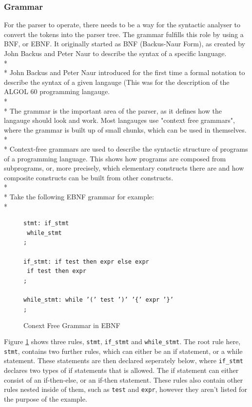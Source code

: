 \documentclass[12pt]{report}
\begin{document}
\subsubsection{Grammar}\label{subsubsec:grammar}
For the parser to operate, there needs to be a way for the syntactic analyser to convert the tokens into the parser tree.  The grammar fulfills this role by using a BNF, or EBNF.  It originally started as BNF (Backus-Naur Form), as created by John Backus and Peter Naur to describe the syntax of a specific language.\\*
\\*
John Backus and Peter Naur introduced for the first time a formal notation to describe the syntax of a given langauge (This was for the description of the ALGOL 60 programming langauge. \citep{whatisbnfnotation}
\\*
\\*
The grammar is the important area of the parser, as it defines how the langauge should look and work.  Most langauges use "context free grammars", where the grammar is built up of small chunks, which can be used in themselves.\\*
\\*
Context-free grammars are used to describe the syntactic structure of programs of a programming language.  This shows how programs are composed from subprograms, or, more precisely, which elementary constructs there are and how composite constructs can be built from other constructs. \citep{compilerdesign95}\\*
\\*
Take the following EBNF grammar for example:\\*
\begin{figure}[H]
\begin{tabbing}
\texttt{stmt:}\= \texttt{ if\_stmt}\\
\>\textbar \texttt { while\_stmt}\\
\>\texttt{;}\\
\\
\texttt{if\_stmt:}\= \texttt{ if test then expr else expr}\\
\>\textbar \texttt{ if test then expr}\\
\>\texttt{;}\\
\\
\texttt{while\_stmt:}\= \texttt{ while '(' test ')' '\{' expr '\}'}\\
\>\texttt{;}\\
\end{tabbing}
\caption{Conext Free Grammar in EBNF}\label{fig:context_free}
\end{figure}
Figure \ref{fig:context_free} shows three rules, \texttt{stmt}, \texttt{if\_stmt} and \texttt{while\_stmt}.  The root rule here, \texttt{stmt}, contains two further rules, which can either be an if statement, or a while statement.  These statements are then declared seperately below, where \texttt{if\_stmt} declares two types of if statements that is allowed.  The if statement can either consist of an if-then-else, or an if-then statement.  These rules also contain other rules nested inside of them, such as \texttt{test} and \texttt{expr}, however they aren't listed for the purpose of the example.
\end{document}
